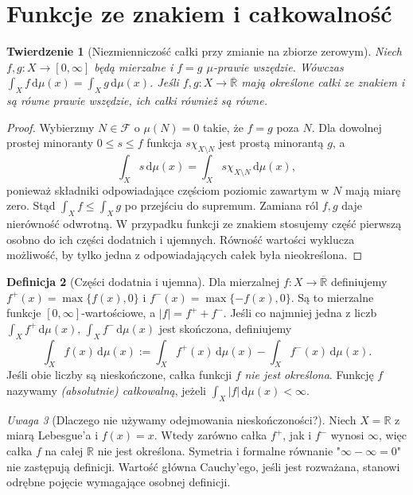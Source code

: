 \documentclass[11pt,a4paper,oneside]{book}
\numberwithin{equation}{chapter}
\theoremstyle{plain}
\newtheorem{twierdzenie}{Twierdzenie}[chapter]
\theoremstyle{definition}
\newtheorem{definicja}[twierdzenie]{Definicja}
\theoremstyle{remark}
\newtheorem{uwaga}[twierdzenie]{Uwaga}
\begin{document}
\section{Funkcje ze znakiem i całkowalność}

\begin{twierdzenie}[Niezmienniczość całki przy zmianie na zbiorze zerowym]
\label{thm:ae-integral-invariance}
Niech $f,g:X\to[0,\infty]$ będą mierzalne i
$f=g$ $\mu$-prawie wszędzie. Wówczas
$\int_Xf\,\mathrm d\mu(x)=\int_Xg\,\mathrm d\mu(x)$.
Jeśli $f,g:X\to\overline{\mathbb R}$ mają określone
całki ze znakiem i są równe prawie wszędzie, ich
całki również są równe.
\end{twierdzenie}
\begin{proof}
Wybierzmy $N\in\mathcal F$ o $\mu(N)=0$ takie,
że $f=g$ poza $N$. Dla dowolnej prostej minoranty
$0\le s\le f$ funkcja $s\chi_{X\setminus N}$
jest prostą minorantą $g$, a
\[
\int_Xs\,\mathrm d\mu(x)
=\int_Xs\chi_{X\setminus N}\,\mathrm d\mu(x),
\]
ponieważ składniki odpowiadające częściom poziomic
zawartym w $N$ mają miarę zero. Stąd
$\int_X f\le\int_X g$ po przejściu do supremum.
Zamiana ról $f,g$ daje nierówność odwrotną.
W przypadku funkcji ze znakiem stosujemy część
pierwszą osobno do ich części dodatnich i ujemnych.
Równość wartości wyklucza możliwość, by tylko jedna
z odpowiadających całek była nieokreślona.
\end{proof}

\begin{definicja}[Części dodatnia i ujemna]
\label{def:positive-negative-parts}
Dla mierzalnej $f:X\to\overline{\mathbb R}$ definiujemy
$f^+(x)=\max\{f(x),0\}$ i
$f^-(x)=\max\{-f(x),0\}$. Są to mierzalne funkcje
$[0,\infty]$-wartościowe, a $|f|=f^++f^-$.
Jeśli co najmniej jedna z liczb
$\int_Xf^+\,\mathrm d\mu(x)$,
$\int_Xf^-\,\mathrm d\mu(x)$ jest skończona, definiujemy
\begin{equation}\label{eq:signed-integral}
\int_X f(x)\,\mathrm d\mu(x)
:=\int_Xf^+(x)\,\mathrm d\mu(x)
-\int_Xf^-(x)\,\mathrm d\mu(x).
\end{equation}
Jeśli obie liczby są nieskończone, całka funkcji $f$
\emph{nie jest określona}. Funkcję $f$ nazywamy
\emph{(absolutnie) całkowalną}, jeżeli
$\int_X|f|\,\mathrm d\mu(x)<\infty$.
\end{definicja}

\begin{uwaga}[Dlaczego nie używamy odejmowania nieskończoności?]
Niech $X=\mathbb R$ z miarą Lebesgue'a i
$f(x)=x$. Wtedy zarówno całka $f^+$, jak i $f^-$
wynosi $\infty$, więc całka $f$ na całej $\mathbb R$
nie jest określona. Symetria i formalne równanie
"$\infty-\infty=0$" nie zastępują definicji.
Wartość główna Cauchy'ego, jeśli jest rozważana,
stanowi odrębne pojęcie wymagające osobnej definicji.
\end{uwaga}
\end{document}
